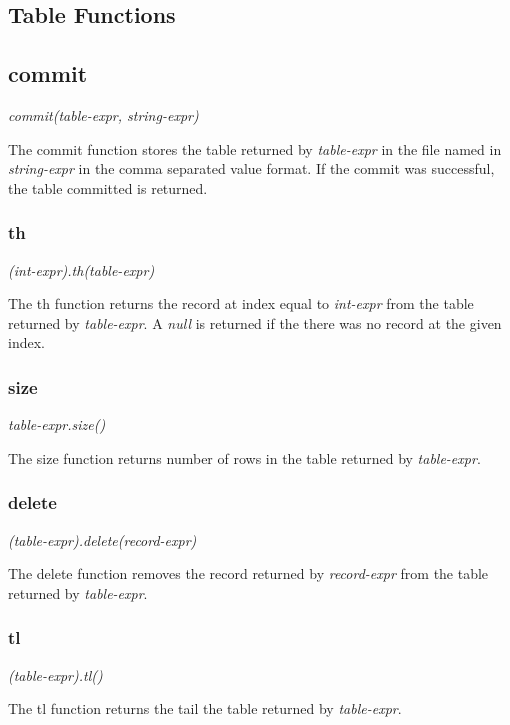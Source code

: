 \subsection{Table Functions}
\subsection{commit}
\begin{center}
\textsl{commit(table-expr, string-expr)}
\end{center}
The commit function stores the table returned by \textsl{table-expr} in the file named in 
\textsl{string-expr} in the comma separated value format. If the commit was successful, the 
table committed is returned.

\subsubsection{th}
\begin{center}
\textsl{(int-expr).th(table-expr)}
\end{center}
The th function returns the record at index equal to \textsl{int-expr} from the table returned by 
\textsl{table-expr}. A \textsl{null} is returned if the there was no record at the given index.

\subsubsection{size}
\begin{center}
\textsl{table-expr.size()}
\end{center}
The size function returns number of rows in the table returned by \textsl{table-expr}.

\subsubsection{delete}
\begin{center}
\textsl{(table-expr).delete(record-expr)}
\end{center}
The delete function removes the record returned by \textsl{record-expr} from the table returned by 
\textsl{table-expr}.

\subsubsection{tl}
\begin{center}
\textsl{(table-expr).tl()}
\end{center}
The tl function returns the tail the table returned by \textsl{table-expr}.


